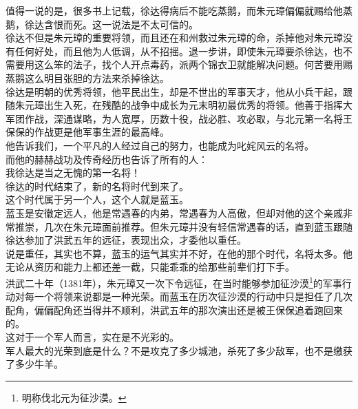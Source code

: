 \begin{multicols}{\theparacolNo}
值得一说的是，很多书上记载，徐达得病后不能吃蒸鹅，而朱元璋偏偏就赐给他蒸鹅，徐达含恨而死。这一说法是不太可信的。\\

徐达不但是朱元璋的重要将领，而且还在和州救过朱元璋的命，杀掉他对朱元璋没有任何好处，而且他为人低调，从不招摇。退一步讲，即使朱元璋要杀徐达，也不需要用这么笨的法子，找个人开点毒药，派两个锦衣卫就能解决问题。何苦要用赐蒸鹅这么明目张胆的方法来杀掉徐达。\\

徐达是明朝的优秀将领，他平民出生，却是不世出的军事天才，他从小兵干起，跟随朱元璋出生入死，在残酷的战争中成长为元末明初最优秀的将领。他善于指挥大军团作战，深通谋略，为人宽厚，历数十役，战必胜、攻必取，与北元第一名将王保保的作战更是他军事生涯的最高峰。\\

他告诉我们，一个平凡的人经过自己的努力，也能成为叱姹风云的名将。\\

而他的赫赫战功及传奇经历也告诉了所有的人：\\

我徐达是当之无愧的第一名将！\\

徐达的时代结束了，新的名将时代到来了。\\

这个时代属于另一个人，这个人就是蓝玉。\\

蓝玉是安徽定远人，他是常遇春的内弟，常遇春为人高傲，但却对他的这个亲戚非常推崇，几次在朱元璋面前推荐。但朱元璋并没有轻信常遇春的话，直到蓝玉跟随徐达参加了洪武五年的远征，表现出众，才委他以重任。\\

说是重任，其实也不算，蓝玉的运气其实并不好，在他的那个时代，名将太多。他无论从资历和能力上都还差一截，只能乖乖的给那些前辈们打下手。\\

洪武二十年（1381年），朱元璋又一次下令远征，在当时能够参加征沙漠\footnote{明称伐北元为征沙漠。}的军事行动对每一个将领来说都是一种光荣。而蓝玉在历次征沙漠的行动中只是担任了几次配角，偏偏配角还当得并不顺利，洪武五年的那次演出还是被王保保追着跑回来的。\\

这对于一个军人而言，实在是不光彩的。\\

军人最大的光荣到底是什么？不是攻克了多少城池，杀死了多少敌军，也不是缴获了多少牛羊。\\


\end{multicols}
